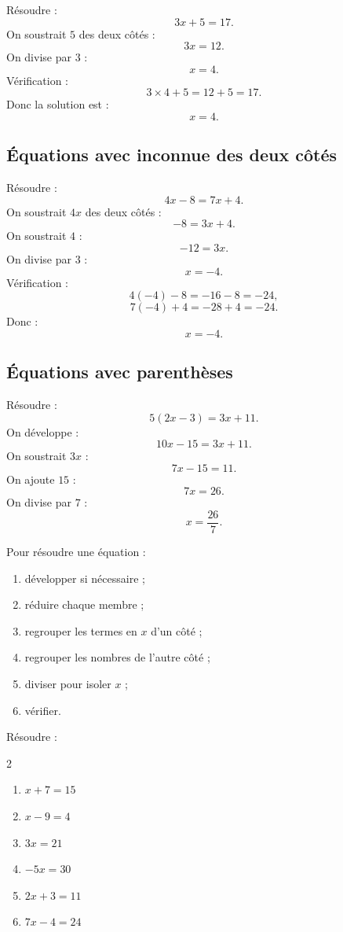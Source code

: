 \documentclass[11pt,a4paper]{article}
\newcounter{exercice}
\newcommand{\encadre}[1]{\boxed{\displaystyle #1}}
\begin{document}
\begin{exemple}
Résoudre :
\[
3x+5=17.
\]
On soustrait $5$ des deux côtés :
\[
3x=12.
\]
On divise par $3$ :
\[
x=4.
\]
Vérification :
\[
3\times4+5=12+5=17.
\]
Donc la solution est :
\[
\encadre{x=4}.
\]
\end{exemple}

\subsection{Équations avec inconnue des deux côtés}

\begin{exemple}
Résoudre :
\[
4x-8=7x+4.
\]
On soustrait $4x$ des deux côtés :
\[
-8=3x+4.
\]
On soustrait $4$ :
\[
-12=3x.
\]
On divise par $3$ :
\[
x=-4.
\]
Vérification :
\[
4(-4)-8=-16-8=-24,
\]
\[
7(-4)+4=-28+4=-24.
\]
Donc :
\[
\encadre{x=-4}.
\]
\end{exemple}

\subsection{Équations avec parenthèses}

\begin{exemple}
Résoudre :
\[
5(2x-3)=3x+11.
\]
On développe :
\[
10x-15=3x+11.
\]
On soustrait $3x$ :
\[
7x-15=11.
\]
On ajoute $15$ :
\[
7x=26.
\]
On divise par $7$ :
\[
x=\frac{26}{7}.
\]
\end{exemple}

\begin{methode}
Pour résoudre une équation :
\begin{enumerate}
  \item développer si nécessaire ;
  \item réduire chaque membre ;
  \item regrouper les termes en $x$ d'un côté ;
  \item regrouper les nombres de l'autre côté ;
  \item diviser pour isoler $x$ ;
  \item vérifier.
\end{enumerate}
\end{methode}

\begin{exercice}
Résoudre :
\begin{multicols}{2}
\begin{enumerate}[label=\alph*)]
  \item $x+7=15$
  \item $x-9=4$
  \item $3x=21$
  \item $-5x=30$
  \item $2x+3=11$
  \item $7x-4=24$
\end{enumerate}
\end{multicols}
\end{exercice}
\end{document}
